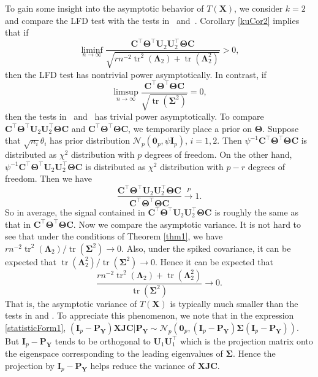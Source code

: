\documentclass[12pt]{article} %
\DeclareMathOperator{\mytr}{tr}
\newcommand{\bX}{\mathbf{X}}
\newcommand{\bP}{\mathbf{P}}
\newcommand{\bY}{\mathbf{Y}}
\newcommand{\bJ}{\mathbf{J}}
\newcommand{\bC}{\mathbf{C}}
\newcommand{\bI}{\mathbf{I}}
\newcommand{\bU}{\mathbf{U}}
\newcommand{\bfsym}[1]{\ensuremath{\boldsymbol{#1}}}
\def\bLambda {\bfsym {\Lambda}}
\def\bSigma {\bfsym {\Sigma}}
\def\bTheta {\bfsym {\Theta}}
\theoremstyle{definition}
\begin{document}
To gain some insight into the asymptotic behavior of $T(\bX)$, we consider $k=2$ and compare the LFD test with the tests in~\cite{Bai1996Efiect} and~\cite{Chen2010A}.
Corollary \ref{kuCor2} implies that if
\begin{equation*}
    \liminf_{n\to \infty}\frac{
    \bC^\top \bTheta^\top \bU_2 \bU_2^\top \bTheta \bC
}{
    \sqrt{
        rn^{-2} \mytr^2 (\bLambda_2) + \mytr(\bLambda_2^2)
    }
}
>0,
\end{equation*}
then the LFD test has nontrivial power asymptotically.
In contrast, if
\begin{equation*}
    \limsup_{n\to \infty}\frac{
    \bC^\top \bTheta^\top \bTheta \bC
}{
    \sqrt{
        \mytr(\bSigma^2)
    }
}
=0,
\end{equation*}
then the tests in~\cite{Bai1996Efiect} and~\cite{Chen2010A} has trivial power asymptotically.
To compare 
$
    \bC^\top \bTheta^\top \bU_2 \bU_2^\top \bTheta \bC
$
and
$
    \bC^\top \bTheta^\top \bTheta \bC
$,
we temporarily place a prior on $\bTheta$.
Suppose that $\sqrt{n_i} \theta_i$ has prior distribution $\mathcal{N}_p(\mathbf{0}_p,\psi \bI_p)$, $i=1,2$.
Then
$
\psi^{-1}\bC^\top \bTheta^\top \bTheta \bC$
is distributed as $\chi^2$ distribution with $p$ degrees of freedom.
On the other hand,
$\psi^{-1}\bC^\top \bTheta^\top \bU_2 \bU_2^\top \bTheta \bC$  is distributed as 
$\chi^2$ distribution with $p-r$ degrees of freedom.
Then we have
$$
\frac{\bC^\top \bTheta^\top \bU_2 \bU_2^\top \bTheta \bC}{\bC^\top \bTheta^\top \bTheta \bC}\xrightarrow{P}1.
$$
So in average, the signal contained in $\bC^\top \bTheta^\top \bU_2 \bU_2^\top \bTheta \bC$ is roughly the same as that in $\bC^\top \bTheta^\top \bTheta \bC$.
Now we compare the asymptotic variance.
It is not hard to see that under the conditions of Theorem \ref{thm1}, we have
    ${rn^{-2} \mytr^2 (\bLambda_2)}/{
        \mytr(\bSigma^2)
    }\to 0$.
Also, under the spiked covariance, it can be expected that $\mytr(\bLambda_2^2)/\mytr(\bSigma^2) \to 0$.
Hence it can be expected that
\begin{equation*}
    \frac{rn^{-2} \mytr^2 (\bLambda_2)  + \mytr(\bLambda_2^2)}{
        \mytr(\bSigma^2)
    }\to 0.
\end{equation*}
That is, the asymptotic variance of $T(\bX)$ is typically much smaller than the tests in \cite{Bai1996Efiect} and \cite{Chen2010A}.
To appreciate this phenomenon,  we note that in the expression \eqref{statisticForm1},
$(\bI_p-\bP_\bY)\bX \bJ \bC|\bP_{\bY}\sim \mathcal{N}_p(\mathbf{0}_p,(\bI_p-\bP_\bY)\bSigma(\bI_p-\bP_\bY))$.
But $\bI_p-\bP_\bY$ tends to be orthogonal to $\bU_1 \bU_1^\top$ which is the projection matrix onto the eigenspace corresponding to the leading eigenvalues of $\bSigma$.
Hence the projection by $\bI_p-\bP_\bY$ helps reduce the variance of $\bX \bJ \bC$.
\end{document}
